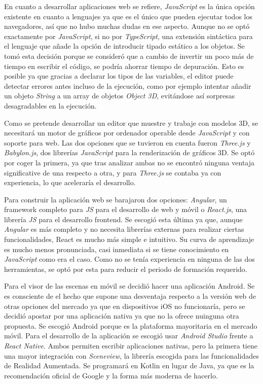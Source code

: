 En cuanto a desarrollar aplicaciones web se refiere, \textit{JavaScript} es la única opción existente en cuanto a lenguajes ya que es el único que pueden ejecutar todos los navegadores, así que no hubo muchas dudas en ese aspecto. Aunque no se optó exactamente por \textit{JavaScript}, si no por \textit{TypeScript}, una extensión sintáctica para el lenguaje que añade la opción de introducir tipado estático a los objetos. Se tomó esta decisión porque se consideró que a cambio de invertir un poco más de tiempo en escribir el código, se podría ahorrar tiempo de depuración. Esto es posible ya que gracias a declarar los tipos de las variables, el editor puede detectar errores antes incluso de la ejecución, como por ejemplo intentar añadir un objeto \textit{String} a un array de objetos \textit{Object 3D}, evitándose así sorpresas desagradables en la ejecución.

Como se pretende desarrollar un editor que muestre y trabaje con modelos 3D, se necesitará un motor de gráficos por ordenador operable desde \textit{JavaScript} y con soporte para web. Las dos opciones que se tuvieron en cuenta fueron \textit{Three.js}\cite{three} y \textit{Babylon.js}\cite{babylon}, dos librerías \textit{JavaScript} para la renderización de gráficos 3D. Se optó por coger la primera, ya que tras analizar ambas no se encontró ninguna ventaja significative de una respecto a otra, y para \textit{Three.js} se contaba ya con experiencia, lo que aceleraría el desarrollo.

Para construir la aplicación web se barajaron dos opciones: \textit{Angular}\cite{angular}, un framework completo para \textit{JS} para el desarrollo de web y móvil o \textit{React.js}\cite{react}, una librería \textit{JS} para el desarrollo frontend. Se escogió esta última ya que, aunque \textit{Angular} es más completo y no necesita librerías externas para realizar ciertas funcionalidades, React es mucho más simple e intuitivo. Su curva de aprendizaje es mucho menos pronunciada, casi inmediata si se tiene conocimiento en \textit{JavaScript} como era el caso. Como no se tenía experiencia en ninguna de las dos herramientas, se optó por esta para reducir el periodo de formación requerido.

Para el visor de las escenas en móvil se decidió hacer una aplicación Android. Se es consciente de el hecho que supone una desventaja respecto a la versión web de otras opciones del mercado ya que en dispositivos iOS no funcionaría, pero se decidió apostar por una aplicación nativa ya que no la ofrece nuinguna otra propuesta. Se escogió Android porque es la plataforma mayoritaria en el mercado móvil. Para el desarrollo de la aplicación se escogió usar \textit{Android Studio} frente a \textit{React Native}. Ambos permiten escribir aplicaciones nativas, pero la primera tiene una mayor integración con \textit{Sceneview}, la librería escogida para las funcionalidades de Realidad Aumentada. Se programará en Kotlin en lugar de Java, ya que es la recomendación oficial de Google y la forma más moderna de hacerlo.

